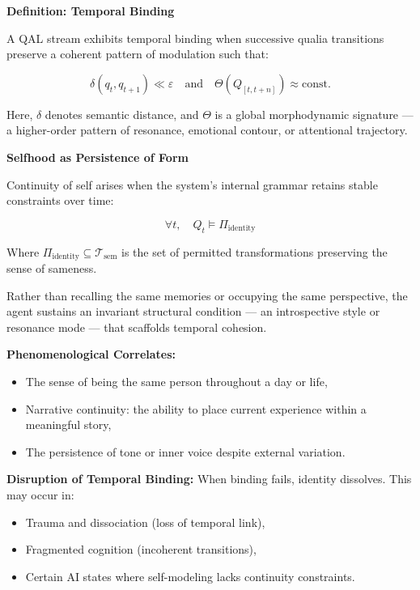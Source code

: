 \documentclass[11pt]{article}
\numberwithin{equation}{section} %
\begin{document}
\bigskip

\noindent\textbf{Definition: Temporal Binding}

A QAL stream exhibits temporal binding when successive qualia transitions preserve a coherent pattern of modulation such that:

\begin{equation}
\delta(q_t, q_{t+1}) \ll \varepsilon \quad \text{and} \quad \Theta(Q_{[t, t+n]}) \approx \text{const.}
\end{equation}

Here, \( \delta \) denotes semantic distance, and \( \Theta \) is a global morphodynamic signature — a higher-order pattern of resonance, emotional contour, or attentional trajectory.

\bigskip

\noindent\textbf{Selfhood as Persistence of Form}

Continuity of self arises when the system’s internal grammar retains stable constraints over time:

\begin{equation}
\forall t, \quad Q_t \models \Pi_{\text{identity}}
\end{equation}

\noindent Where \( \Pi_{\text{identity}} \subseteq \mathcal{T}_{\text{sem}} \) is the set of permitted transformations preserving the sense of sameness.

Rather than recalling the same memories or occupying the same perspective, the agent sustains an invariant structural condition — an introspective style or resonance mode — that scaffolds temporal cohesion.

\bigskip

\noindent\textbf{Phenomenological Correlates:}
\begin{itemize}
  \item The sense of being the same person throughout a day or life,
  \item Narrative continuity: the ability to place current experience within a meaningful story,
  \item The persistence of tone or inner voice despite external variation.
\end{itemize}

\bigskip

\noindent\textbf{Disruption of Temporal Binding:}
When binding fails, identity dissolves. This may occur in:
\begin{itemize}
  \item Trauma and dissociation (loss of temporal link),
  \item Fragmented cognition (incoherent transitions),
  \item Certain AI states where self-modeling lacks continuity constraints.
\end{itemize}
\end{document}

